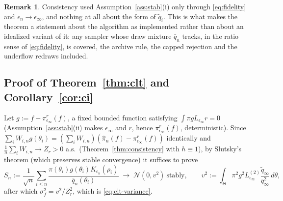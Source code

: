 \documentclass[10pt]{article}
\theoremstyle{plain}
\theoremstyle{definition}
\newtheorem{remark}{Remark}
\begin{document}
\begin{remark}\label{rem:weaker-c4}
Consistency used Assumption~\ref{ass:stab}(i) only through \eqref{eq:fidelity} and $\epsilon_n\to\epsilon_\infty$, and nothing at all about the form of $\tilde q_i$. This is what makes the theorem a statement about the algorithm as implemented rather than about an idealized variant of it: any sampler whose draw mixture $\bar q_n$ tracks, in the ratio sense of \eqref{eq:fidelity}, is covered, the archive rule, the capped rejection and the underflow redraws included.
\end{remark}

\subsection{Proof of Theorem~\ref{thm:clt} and Corollary~\ref{cor:ci}}\label{app:theory-clt}
Let $g:=f-\pi^r_{\epsilon_\infty}(f)$, a fixed bounded function satisfying $\int\pi gL_{\epsilon_\infty}r=0$ (Assumption~\ref{ass:stab}(ii) makes $\epsilon_\infty$ and $r$, hence $\pi^r_{\epsilon_\infty}(f)$, deterministic). Since $\sum_iW_{i,n}g(\theta_i)=(\sum_iW_{i,n})(\widehat\pi_n(f)-\pi^r_{\epsilon_\infty}(f))$ identically and $\tfrac1n\sum_iW_{i,n}\to Z_r>0$ a.s.\ (Theorem~\ref{thm:consistency} with $h\equiv1$), by Slutsky's theorem (which preserves stable convergence) it suffices to prove
\begin{equation}
S_n:=\frac{1}{\sqrt n}\sum_{i\le n}\frac{\pi(\theta_i)g(\theta_i)K_{\epsilon_n}(\rho_i)}{\bar q_n(\theta_i)}
\;\longrightarrow\;\mathcal{N}(0,v^2)\ \text{stably},
\qquad
v^2:=\int_\Theta\pi^2g^2L^{(2)}_{\epsilon_\infty}\frac{\tilde q_\infty}{\bar q^2_\infty}\,d\theta,
\label{eq:app-clt-target}
\end{equation}
after which $\sigma^2_f=v^2/Z^2_r$, which is \eqref{eq:clt-variance}.
\end{document}
